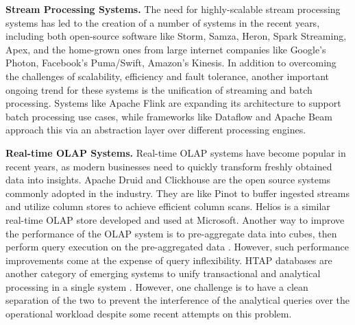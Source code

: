 \documentclass[sigconf]{acmart}
\begin{document}
{\bfseries Stream Processing Systems.} The need for highly-scalable stream processing systems has led to the creation of a number of systems in the recent years, including both open-source software like Storm\cite{storm}, Samza\cite{samza}, Heron\cite{kulkarni2015twitter}, Spark Streaming\cite{zaharia2013discretized}, Apex\cite{apex}, and the home-grown ones from large internet companies like Google's Photon\cite{ananthanarayanan2013photon}, Facebook’s Puma/Swift\cite{chen2016realtime}, Amazon's Kinesis\cite{kinesis}. In addition to overcoming the challenges of scalability, efficiency and fault tolerance, another important ongoing trend for these systems is the unification of streaming and batch processing. Systems like Apache Flink\cite{carbone2015apache} are expanding its architecture to support batch processing use cases, while frameworks like Dataflow\cite{akidau2015dataflow} and Apache Beam\cite{beam} approach this via an abstraction layer over different processing engines.

{\bfseries Real-time OLAP Systems.} Real-time OLAP systems have become popular in recent years, as modern businesses need to quickly transform freshly obtained data into insights. Apache Druid\cite{yang2014druid} and Clickhouse\cite{clickhouse} are the open source systems commonly adopted in the industry. They are like Pinot to buffer ingested streams and utilize column stores to achieve efficient column scans. Helios\cite{potharaju2020helios} is a similar real-time OLAP store developed and used at Microsoft. Another way to improve the performance of the OLAP system is to pre-aggregate data into cubes, then perform query execution on the pre-aggregated data \cite{kylin}. However, such performance improvements come at the expense of query inflexibility. HTAP databases are another category of emerging systems to unify transactional and analytical processing in a single system \cite{kemper2011hyper} \cite{huang2020tidb} \cite{farber2012sap}. However, one challenge is to have a clean separation of the two to prevent the interference of the analytical queries over the operational workload\cite{psaroudakis2014scaling} despite some recent attempts on this problem\cite{makreshanski2017batchdb}.
 
\end{document}
